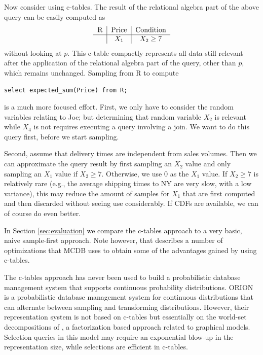 \begin{example}
Now consider using c-tables. The result of the relational algebra part of the
above query can be easily computed as
\[
\begin{tabular}{c|c|c}
R & Price & Condition \\
\hline
& $X_1$ & $X_2 \ge 7$ \\
\end{tabular}
\]
without looking at $p$.
This c-table compactly represents all data still relevant after the
application of the relational algebra part of the query, other than $p$,
which remains unchanged.
Sampling from R to compute
\begin{verbatim}
select expected_sum(Price) from R;
\end{verbatim}
is a much more focused effort.
First, we only have to consider the random variables relating to Joe;
but determining that random variable $X_2$ is relevant while $X_4$
is not requires
executing a query involving a join. We want to do this query first, before
we start sampling.

Second, assume that delivery times are
independent from sales volumes. Then we can approximate the
query result
by first sampling an $X_2$ value and only sampling an $X_1$ value if $X_2 \ge 7$.
Otherwise, we use $0$ as the $X_1$ value.
If $X_2 \ge 7$ is relatively rare (e.g., the average shipping times to NY are
very slow, with a low variance), this may reduce the amount of samples
for $X_1$ that are first computed and then discarded without seeing use
considerably.
If CDFs are available, we can of course do even better.

In Section \ref{sec:evaluation} we compare the c-tables approach to a very basic, 
naive sample-first approach.  Note however, that \cite{MCDB} describes a number of 
optimizations that MCDB uses to obtain some of the advantages gained by using c-tables.
%
\punto
\end{example}


The  c-tables  approach has  never  been used  to build  a
probabilistic  database  management  system that  supports  continuous
probability  distributions.
%
ORION \cite{ORION} is a probabilistic database management system for
continuous distributions that can alternate between sampling
and transforming distributions. However, their representation
system is not based on c-tables but essentially on the
world-set decompositions of \cite{AKO07WSD}, a factorization
based approach related to graphical models.
Selection queries in this model may require an exponential blow-up in the
representation size, while selections are efficient in c-tables.


